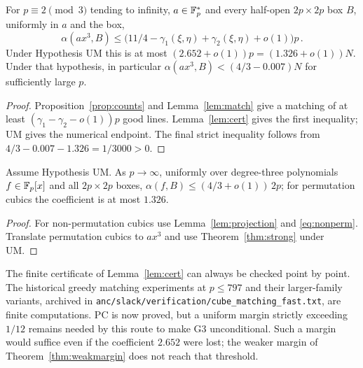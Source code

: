 \begin{theorem}\label{thm:strong}
For $p\equiv2\pmod3$ tending to infinity, $a\in\mathbb{F}_p^*$ and every half-open $2p\times2p$ box $B$, uniformly in $a$ and the box,
\[
 \alpha(ax^3,B)\le\bigl(11/4-\gamma_1(\xi,\eta)+\gamma_2(\xi,\eta)+o(1)\bigr)p
\,.
\]
Under Hypothesis UM this is at most $(2.652+o(1))p=(1.326+o(1))N$.
Under that hypothesis, in particular $\alpha(ax^3,B)<(4/3-0.007)N$ for sufficiently large $p$.
\end{theorem}
\begin{proof}
Proposition~\ref{prop:counts} and Lemma~\ref{lem:match} give a matching of at least
$(\gamma_1-\gamma_2-o(1))p$ good lines.  Lemma~\ref{lem:cert} gives the first inequality; UM gives the numerical endpoint.
The final strict inequality follows from $4/3-0.007-1.326=1/3000>0$.
\end{proof}

\begin{corollary}[G3, conditional on UM]\label{cor:g3}
Assume Hypothesis UM.  As $p\to\infty$, uniformly over degree-three polynomials $f\in\mathbb{F}_p[x]$ and all $2p\times2p$ boxes,
$\alpha(f,B)\le(4/3+o(1))\,2p$; for permutation cubics the coefficient is at most $1.326$.
\end{corollary}
\begin{proof}
For non-permutation cubics use Lemma~\ref{lem:projection} and \eqref{eq:nonperm}.
Translate permutation cubics to $ax^3$ and use Theorem~\ref{thm:strong} under UM.
\end{proof}

\begin{remark}
The finite certificate of Lemma~\ref{lem:cert} can always be checked point by point.
The historical greedy matching experiments at $p\le797$ and their larger-family variants, archived in
\texttt{anc/slack/verification/cube\_matching\_fast.txt}, are finite computations.  PC is now proved, but a uniform margin strictly exceeding $1/12$
remains needed by this route to make G3 unconditional.  Such a margin would suffice even if the coefficient $2.652$ were lost;
the weaker margin of Theorem~\ref{thm:weakmargin} does not reach that threshold.
\end{remark}
